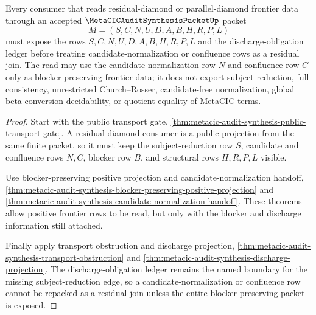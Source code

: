 \begin{theorem}
\label{thm:metacic-audit-synthesis-residual-diamond-handoff}
Every consumer that reads residual-diamond or parallel-diamond frontier data through an accepted $\MetaCICAuditSynthesisPacketUp$ packet
$$
M=(S,C,N,U,D,A,B,H,R,P,L)
$$
must expose the rows $S,C,N,U,D,A,B,H,R,P,L$ and the discharge-obligation ledger before treating candidate-normalization or confluence rows as a residual join. The read may use the candidate-normalization row $N$ and confluence row $C$ only as blocker-preserving frontier data; it does not export subject reduction, full consistency, unrestricted Church--Rosser, candidate-free normalization, global beta-conversion decidability, or quotient equality of MetaCIC terms.
\end{theorem}
\begin{proof}
Start with the public transport gate, \autoref{thm:metacic-audit-synthesis-public-transport-gate}. A residual-diamond consumer is a public projection from the same finite packet, so it must keep the subject-reduction row $S$, candidate and confluence rows $N,C$, blocker row $B$, and structural rows $H,R,P,L$ visible.

Use blocker-preserving positive projection and candidate-normalization handoff, \autoref{thm:metacic-audit-synthesis-blocker-preserving-positive-projection} and \autoref{thm:metacic-audit-synthesis-candidate-normalization-handoff}. These theorems allow positive frontier rows to be read, but only with the blocker and discharge information still attached.

Finally apply transport obstruction and discharge projection, \autoref{thm:metacic-audit-synthesis-transport-obstruction} and \autoref{thm:metacic-audit-synthesis-discharge-projection}. The discharge-obligation ledger remains the named boundary for the missing subject-reduction edge, so a candidate-normalization or confluence row cannot be repacked as a residual join unless the entire blocker-preserving packet is exposed.
\end{proof}

